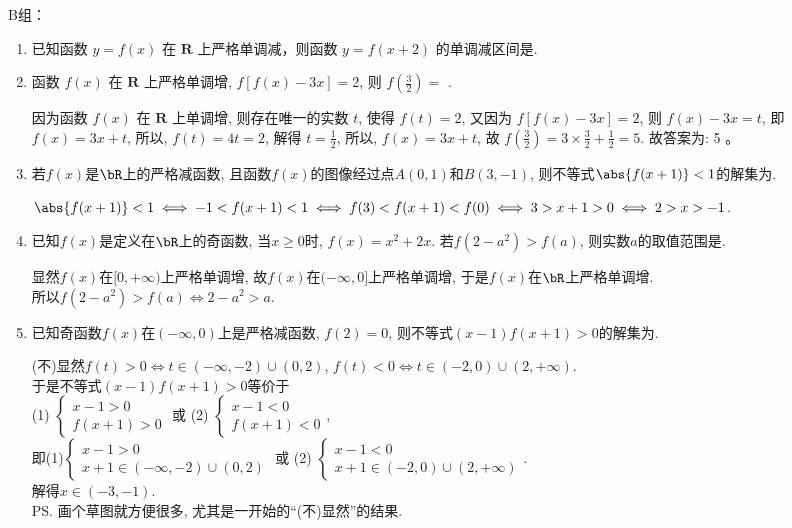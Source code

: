 B组：
\begin{enumerate}
\item 已知函数 $y=f(x)$ 在 $\mathbf{R}$ 上严格单调减，则函数 $y=f(x+2)$ 的单调减区间是\blkda{$[-2,+\infty)$}.


\item 函数 $f(x)$ 在 $\mathbf{R}$ 上严格单调增, $f[f(x)-3 x]=2$, 则 $f\left(\frac{3}{2}\right)=$ .
\begin{jieda}
因为函数 $f(x)$ 在 $\mathbf{R}$ 上单调增, 则存在唯一的实数 $t$, 使得 $f(t)=2$,
又因为 $f[f(x)-3 x]=2$, 则 $f(x)-3 x=t$, 即 $f(x)=3 x+t$,
所以, $f(t)=4 t=2$, 解得 $t=\frac{1}{2}$, 所以, $f(x)=3 x+t$, 故 $f\left(\frac{3}{2}\right)=3 \times \frac{3}{2}+\frac{1}{2}=5$.
故答案为: 5 。
\end{jieda}

\item 若$f(x)$是$\bR$上的严格减函数, 且函数$f(x)$的图像经过点$A(0,1)$和$B(3,-1)$, 则不等式$\abs{f(x+1)}<1$的解集为. 
\begin{jieda}
$\abs{f(x+1)}<1\iff -1<f(x+1)<1\iff f(3)<f(x+1)<f(0)\iff 3>x+1>0\iff 2>x>-1$. 
\end{jieda}

\item 已知$f(x)$是定义在$\bR$上的奇函数, 当$x\geq 0$时, $f(x)=x^2+2x$. 若$f(2-a^2)>f(a)$, 则实数$a$的取值范围是. 
\begin{jieda}
显然$f(x)$在$[0,+\infty)$上严格单调增, 故$f(x)$在$(-\infty,0]$上严格单调增, 于是$f(x)$在$\bR$上严格单调增. \\
所以$f(2-a^2)>f(a)\iff 2-a^2>a$. 
\end{jieda}


\item 已知奇函数$f(x)$在$(-\infty,0)$上是严格减函数, $f(2)=0$, 则不等式$(x-1)f(x+1)>0$的解集为.
\begin{jieda}
(不)显然$f(t)>0\iff t\in(-\infty,-2)\cup(0,2)$, $f(t)<0\iff t\in(-2,0)\cup(2,+\infty)$. \\
于是不等式$(x-1)f(x+1)>0$等价于\\
(1) $\begin{cases}
x-1>0\\
f(x+1)>0
\end{cases}$ 或
(2) $\begin{cases}
x-1<0\\
f(x+1)<0
\end{cases}$, \\
即(1)$\begin{cases}
x-1>0\\
x+1\in(-\infty,-2)\cup(0,2)
\end{cases}$ 或
(2) $\begin{cases}
x-1<0\\
x+1\in(-2,0)\cup(2,+\infty)
\end{cases}$. \\
解得$x\in(-3,-1)$. \\
\ps 画个草图就方便很多, 尤其是一开始的``(不)显然''的结果. 
\end{jieda}



\end{enumerate}
